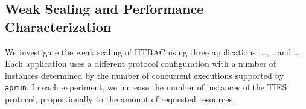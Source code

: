 

\subsection{Weak Scaling and Performance Characterization}


We investigate the weak scaling of HTBAC using three
applications: \ldots, \ldots and \ldots. Each application
uses a different protocol configuration with a number of instances determined
by the number of concurrent executions supported by \texttt{aprun}. In each
experiment, we increase the number of instances of the TIES protocol,
proportionally to the amount of requested resources. 

